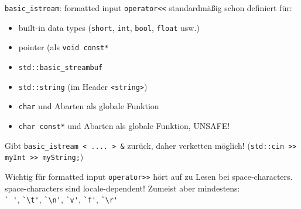 \begin{frame}[fragile]{\texttt{basic\_istream}: formatted input}
	\texttt{operator<<} standardmäßig schon definiert für:
	\begin{itemize}
		\item built-in data types (\texttt{short}, \texttt{int}, \texttt{bool}, \texttt{float} usw.)
		\item pointer (als \texttt{void const*}
		\item \texttt{std::basic\_streambuf}
		\item \texttt{std::string} (im Header \texttt{<string>})
		\item \texttt{char} und Abarten als globale Funktion
		\item \alert{\texttt{char const*} und Abarten als globale Funktion, UNSAFE!}
	\end{itemize}
	Gibt \texttt{basic\_istream < .... > \&} zurück, daher verketten möglich! (\texttt{std::cin >> myInt >> myString;})
	
	\pause
	\vspace{1em}
	
	\begin{block}{Wichtig für formatted input}
		\texttt{operator>>} hört auf zu Lesen bei space-characters.
		space-characters sind locale-dependent! Zumeist aber mindestens:\\
		\verb|` '|, \verb|`\t'|, \verb|`\n'|, \verb|`v'|, \verb|`f'|, \verb|`\r'|
	\end{block}
\end{frame}

